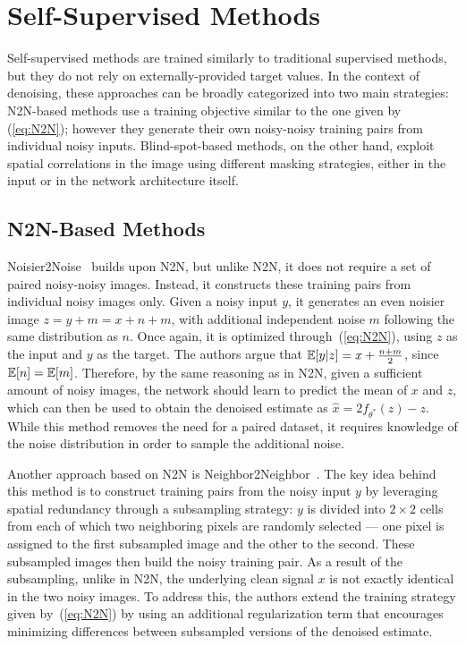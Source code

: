 \section{Self-Supervised Methods}\label{sec:self-supervised}

Self-supervised methods are trained similarly to traditional supervised methods, but they do not rely on externally-provided target values.
In the context of denoising, these approaches can be broadly categorized into two main strategies:
N2N-based methods use a training objective similar to the one given by (\ref{eq:N2N}); however they generate their own noisy-noisy training pairs from individual noisy inputs.
Blind-spot-based methods, on the other hand, exploit spatial correlations in the image using different masking strategies, either in the input or in the network architecture itself.

\subsection{N2N-Based Methods}

Noisier2Noise~\cite{Noisier2Noise} builds upon N2N, but unlike N2N, it does not require a set of paired noisy-noisy images.
Instead, it constructs these training pairs from individual noisy images only.
Given a noisy input $y$, it generates an even noisier image $z = y + m = x + n + m$, with additional independent noise $m$ following the same distribution as $n$.
Once again, it is optimized through~(\ref{eq:N2N}), using $z$ as the input and $y$ as the target.
The authors argue that $\mathbb{E} [y|z] = x + \frac{n + m}{2}$, since $\mathbb{E} [n] = \mathbb{E} [m]$.
Therefore, by the same reasoning as in N2N, given a sufficient amount of noisy images, the network should learn to predict the mean of $x$ and $z$, which can then be used to obtain the denoised estimate as $\hat{x} = 2f_{\theta^*}(z) - z$.
While this method removes the need for a paired dataset, it requires knowledge of the noise distribution in order to sample the additional noise.

Another approach based on N2N is Neighbor2Neighbor~\cite{Neighbor2Neighbor}.
The key idea behind this method is to construct training pairs from the noisy input $y$ by leveraging spatial redundancy through a subsampling strategy:
$y$ is divided into $2 \times 2$ cells from each of which two neighboring pixels are randomly selected --- one pixel is assigned to the first subsampled image and the other to the second.
These subsampled images then build the noisy training pair.
As a result of the subsampling, unlike in N2N, the underlying clean signal $x$ is not exactly identical in the two noisy images.
To address this, the authors extend the training strategy given by~(\ref{eq:N2N}) by using an additional regularization term that encourages minimizing differences between subsampled versions of the denoised estimate.

